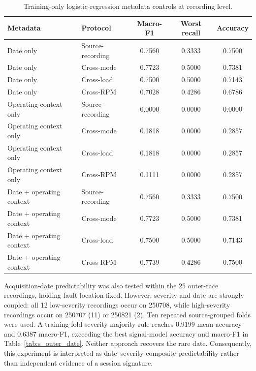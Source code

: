 \documentclass[11pt]{article}
\begin{document}
\begin{table}[H]
\centering
\caption{Training-only logistic-regression metadata controls at recording level.}
\label{tab:s_metadata_control}
\small
\begin{tabular}{llccc}
\toprule
Metadata & Protocol & Macro-F1 & Worst recall & Accuracy \\
\midrule
Date only & Source-recording & 0.7560 & 0.3333 & 0.7500 \\
Date only & Cross-mode & 0.7723 & 0.5000 & 0.7381 \\
Date only & Cross-load & 0.7500 & 0.5000 & 0.7143 \\
Date only & Cross-RPM & 0.7028 & 0.4286 & 0.6786 \\
Operating context only & Source-recording & 0.0000 & 0.0000 & 0.0000 \\
Operating context only & Cross-mode & 0.1818 & 0.0000 & 0.2857 \\
Operating context only & Cross-load & 0.1818 & 0.0000 & 0.2857 \\
Operating context only & Cross-RPM & 0.1111 & 0.0000 & 0.2857 \\
Date + operating context & Source-recording & 0.7560 & 0.3333 & 0.7500 \\
Date + operating context & Cross-mode & 0.7723 & 0.5000 & 0.7381 \\
Date + operating context & Cross-load & 0.7500 & 0.5000 & 0.7143 \\
Date + operating context & Cross-RPM & 0.7739 & 0.4286 & 0.7500 \\
\bottomrule
\end{tabular}
\end{table}

Acquisition-date predictability was also tested within the 25 outer-race recordings, holding fault location fixed. However, severity and date are strongly coupled: all 12 low-severity recordings occur on 250708, while high-severity recordings occur on 250707 (11) or 250821 (2). Ten repeated source-grouped folds were used. A training-fold severity-majority rule reaches 0.9199 mean accuracy and 0.6387 macro-F1, exceeding the best signal-model accuracy and macro-F1 in Table~\ref{tab:s_outer_date}. Neither approach recovers the rare date. Consequently, this experiment is interpreted as date--severity composite predictability rather than independent evidence of a session signature.
\end{document}
